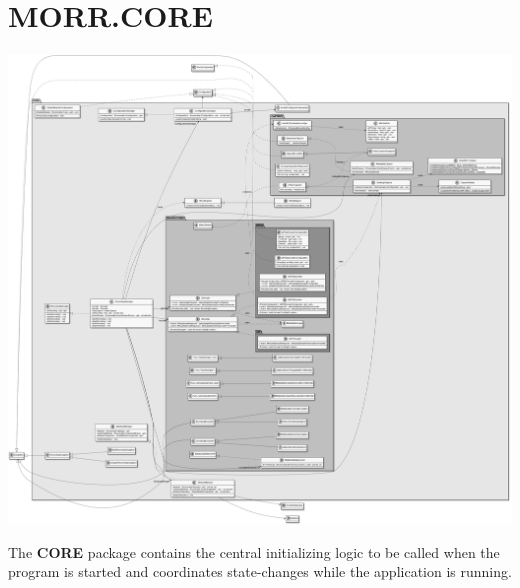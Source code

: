 \newpage
\section{MORR.CORE}

\begin{center}
    \includegraphics[width=1.0\textwidth]{resources/Packages/CORE.png}
\end{center}

The \textbf{CORE} package contains the central initializing logic to be called when the program is started and coordinates state-changes while the application is running.

\begin{packif}
\end{packif}

\begin{packclass}
\end{packclass}

\begin{packpack}
\end{packpack}

